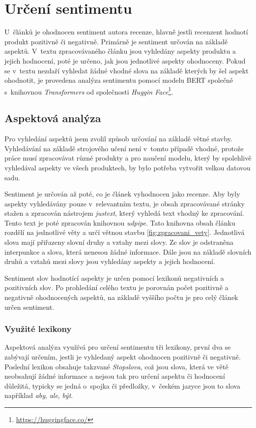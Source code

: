 \section{Určení sentimentu}
U~článků je ohodnocen sentiment autora recenze, hlavně jestli recenzent hodnotí produkt pozitivně či negativně. Primárně je sentiment určován na základě aspektů. V~textu zpracovávaného článku jsou vyhledány aspekty produktu a jejich hodnocení, poté je určeno, jak jsou jednotlivé aspekty ohodnoceny. Pokud se v~textu nezdaří vyhledat žádné vhodné slova na základě kterých by šel aspekt ohodnotit, je provedena analýza sentimentu pomocí modelu BERT společně s~knihovnou \textit{Transformers} od společnosti \textit{Huggin Face}\footnote{\url{https://huggingface.co/}}.

\subsection*{Aspektová analýza}

Pro vyhledání aspektů jsem zvolil způsob určování na základě větné stavby. Vyhledávání na základě strojového učení není v~tomto případě vhodné, protože práce musí zpracovávat různé produkty a pro naučení modelu, který by spolehlivě vyhledával aspekty ve všech produktech, by bylo potřeba vytvořit velkou datovou sadu.

Sentiment je určován až poté, co je článek vyhodnocen jako recenze. Aby byly aspekty vyhledávány pouze v~relevantním textu, je obsah zpracovávané stránky stažen a zpracován nástrojem \textit{justext}, který vyhledá text vhodný ke zpracování. Tento text je poté zpracován knihovnou \textit{udpipe}. Tato knihovna obsah článku rozdělí na jednotlivé věty a určí větnou stavbu \ref{fig:zpracovani_vety}. Jednotlivá slova mají přiřazeny slovní druhy a vztahy mezi slovy. Ze slov je odstraněna interpunkce a slova, která nenesou žádné informace. Dále jsou na základě slovních druhů a vztahů mezi slovy jsou vyhledány aspekty a jejich hodnocení.

Sentiment slov hodnotící aspekty je určen pomocí lexikonů negativních a pozitivních slov. Po prohledání celého textu je porovnán počet pozitivně a negativně ohodnocených aspektů, na základě vyššího počtu je pro celý článek určen sentiment. 

\subsubsection{Využité lexikony}
Aspektová analýza využívá pro určení sentimentu tři lexikony, první dva se zabývají určením, jestli je vyhledaný aspekt ohodnocen pozitivně či negativně. Poslední lexikon obsahuje takzvané \textit{Stopslova}, což jsou slova, která ve větě neobsahují žádné informace a nejsou tak pro určení aspektu či hodnocení důležitá, typicky se jedná o~spojka či předložky, v~českém jazyce jsou to slova například \textit{aby}, \textit{ale}, \textit{být}.

